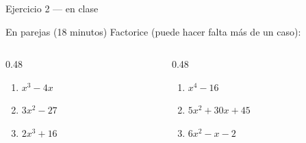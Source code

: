 \documentclass[aspectratio=169,10pt]{beamer}
\begin{document}
\begin{frame}{Ejercicio 2 — en clase}
  \begin{alertblock}{En parejas (18 minutos)}
    \scriptsize
    Factorice  (puede hacer falta más de un caso):

    \vspace{0.25cm}
    \begin{columns}[T,onlytextwidth]
      \begin{column}{0.48\textwidth}
        \begin{enumerate}\setlength{\itemsep}{0.2cm}
          \item $x^{3}-4x$
          \item $3x^{2}-27$
          \item $2x^{3}+16$
        \end{enumerate}
      \end{column}
      \begin{column}{0.48\textwidth}
        \begin{enumerate}\setlength{\itemsep}{0.2cm}
          \setcounter{enumi}{3}
          \item $x^{4}-16$
          \item $5x^{2}+30x+45$
          \item $6x^{2}-x-2$
        \end{enumerate}
      \end{column}
    \end{columns}
  \end{alertblock}
\end{frame}
\end{document}
